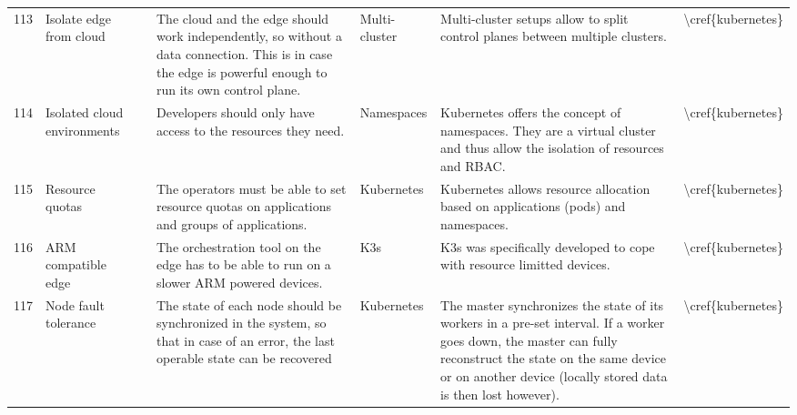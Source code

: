 \begin{longtable}{l p{1.5cm} l p{4cm} p{2cm} p{4cm} l }
113 & Isolate edge from cloud                 &                & The cloud and the edge should work independently, so without a data connection. This is in case the edge is powerful enough to run its own control plane.                                  & Multi-cluster            & Multi-cluster setups allow to split control planes between multiple clusters.                                                                                                                                                  & \textbackslash{}cref\{kubernetes\} \\
114 & Isolated cloud environments             &                & Developers should only have access to the resources they need.                                                                                                                             & Namespaces               & Kubernetes offers the concept of namespaces. They are a virtual cluster and thus allow the isolation of resources and RBAC.                                                                                                    & \textbackslash{}cref\{kubernetes\} \\
115 & Resource quotas                         &                & The operators must be able to set resource quotas on applications and groups of applications.                                                                                              & Kubernetes               & Kubernetes allows resource allocation based on applications (pods) and namespaces.                                                                                                                                             & \textbackslash{}cref\{kubernetes\} \\
116 & ARM compatible edge                     &                & The orchestration tool on the edge has to be able to run on a slower ARM powered devices.                                                                                                  & K3s                      & K3s was specifically developed to cope with resource limitted devices.                                                                                                                                                         & \textbackslash{}cref\{kubernetes\} \\
117 & Node fault tolerance                    &                & The state of each node should be synchronized in the system, so that in case of an error, the last operable state can be recovered                                                         & Kubernetes               & The master synchronizes the state of its workers in a pre-set interval. If a worker goes down, the master can fully reconstruct the state on the same device or on another device (locally stored data is then lost however).  & \textbackslash{}cref\{kubernetes\} \\

\end{longtable}
